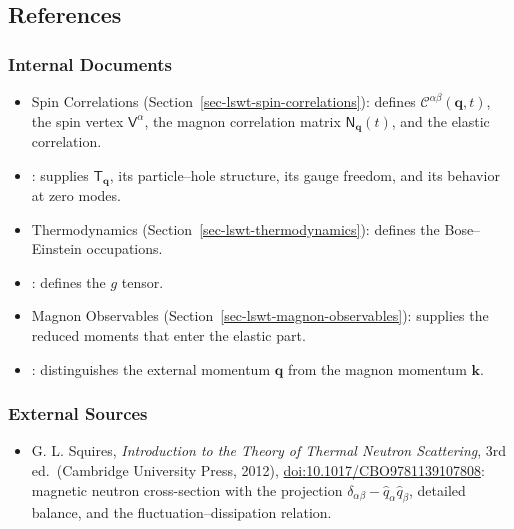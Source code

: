 \subsection{References}

\subsubsection{Internal Documents}

\begin{itemize}
\tightlist
\item
  Spin Correlations (Section~\ref{sec-lswt-spin-correlations}): defines \(\mathcal C^{\alpha\beta}(\mathbf q,t)\), the spin vertex \(\mathsf V^\alpha\), the magnon correlation matrix \(\mathsf N_{\mathbf q}(t)\), and the elastic correlation.
\item
  : supplies \(\mathsf T_{\mathbf q}\), its particle--hole structure, its gauge freedom, and its behavior at zero modes.
\item
  Thermodynamics (Section~\ref{sec-lswt-thermodynamics}): defines the Bose--Einstein occupations.
\item
  : defines the \(g\) tensor.
\item
  Magnon Observables (Section~\ref{sec-lswt-magnon-observables}): supplies the reduced moments that enter the elastic part.
\item
  : distinguishes the external momentum \(\mathbf q\) from the magnon momentum \(\mathbf k\).
\end{itemize}

\subsubsection{External Sources}

\begin{itemize}
\tightlist
\item
  G. L. Squires, \emph{Introduction to the Theory of Thermal Neutron Scattering}, 3rd ed.~(Cambridge University Press, 2012), \href{https://doi.org/10.1017/CBO9781139107808}{doi:10.1017/CBO9781139107808}: magnetic neutron cross-section with the projection \(\delta_{\alpha\beta}-\hat q_\alpha\hat q_\beta\), detailed balance, and the fluctuation--dissipation relation.
\end{itemize}
